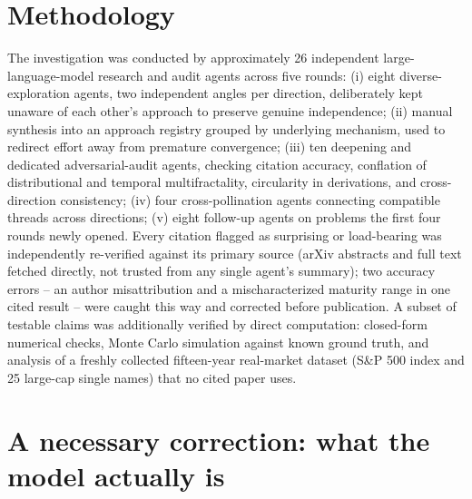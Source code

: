 \documentclass[11pt]{article}
\begin{document}
\section{Methodology}

The investigation was conducted by approximately 26 independent large-language-model research and audit agents across five rounds: (i) eight diverse-exploration agents, two independent angles per direction, deliberately kept unaware of each other's approach to preserve genuine independence; (ii) manual synthesis into an approach registry grouped by underlying mechanism, used to redirect effort away from premature convergence; (iii) ten deepening and dedicated adversarial-audit agents, checking citation accuracy, conflation of distributional and temporal multifractality, circularity in derivations, and cross-direction consistency; (iv) four cross-pollination agents connecting compatible threads across directions; (v) eight follow-up agents on problems the first four rounds newly opened. Every citation flagged as surprising or load-bearing was independently re-verified against its primary source (arXiv abstracts and full text fetched directly, not trusted from any single agent's summary); two accuracy errors -- an author misattribution and a mischaracterized maturity range in one cited result -- were caught this way and corrected before publication. A subset of testable claims was additionally verified by direct computation: closed-form numerical checks, Monte Carlo simulation against known ground truth, and analysis of a freshly collected fifteen-year real-market dataset (S\&P 500 index and 25 large-cap single names) that no cited paper uses.

\section{A necessary correction: what the model actually is}
\end{document}
